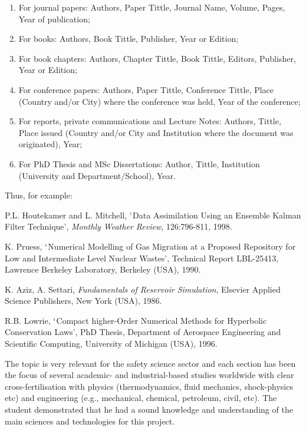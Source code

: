 \documentclass[14pt,twoside]{report}
\begin{document}
\begin{enumerate}
\begin{enumerate}
\item For journal papers: Authors, Paper Tittle, Journal Name, Volume, Pages, Year of publication;
\item For books: Authors, Book Tittle, Publisher, Year or Edition;
\item For book chapters: Authors, Chapter Tittle, Book Tittle, Editors, Publisher, Year or Edition;
\item For conference papers: Authors, Paper Tittle, Conference Tittle, Place (Country and/or City) where the conference was held, Year of the conference;
\item For reports,  private communications and Lecture Notes: Authors, Tittle, Place issued (Country and/or City and Institution where the document was originated), Year;
\item For PhD Thesis and MSc Dissertations: Author, Tittle, Institution (University and Department/School), Year.
\end{enumerate}  
Thus, for example:
\begin{enumerate}[label={[\arabic*]}]
\item P.L. Houtekamer and L. Mitchell, $\lq$Data Assimilation Using an Ensemble Kalman Filter Technique', {\it Monthly Weather Review}, 126:796-811, 1998.
\item K. Pruess, $\lq$Numerical Modelling of Gas Migration at a Proposed Repository for Low and Intermediate Level Nuclear Wastes', Technical Report LBL-25413, Lawrence Berkeley Laboratory, Berkeley (USA), 1990.
\item K. Aziz, A. Settari, {\it Fundamentals of Reservoir Simulation}, Elsevier Applied Science Publishers, New York (USA), 1986.
\item R.B. Lowrie, $\lq$Compact higher-Order Numerical Methods for Hyperbolic Conservation Laws', PhD Thesis, Department of Aerospace Engineering and Scientific Computing, University of Michigan (USA), 1996.
\end{enumerate} 
% 
\end{enumerate}

The topic is very relevant for the safety science sector and each section has been the focus of several academic- and industrial-based studies worldwide with clear cross-fertilisation with physics (thermodynamics, fluid mechanics, shock-physics etc) and engineering (e.g., mechanical, chemical, petroleum, civil, etc). The student demonstrated that he had a sound knowledge and understanding of the main sciences and technologies for this project.
\end{document}
